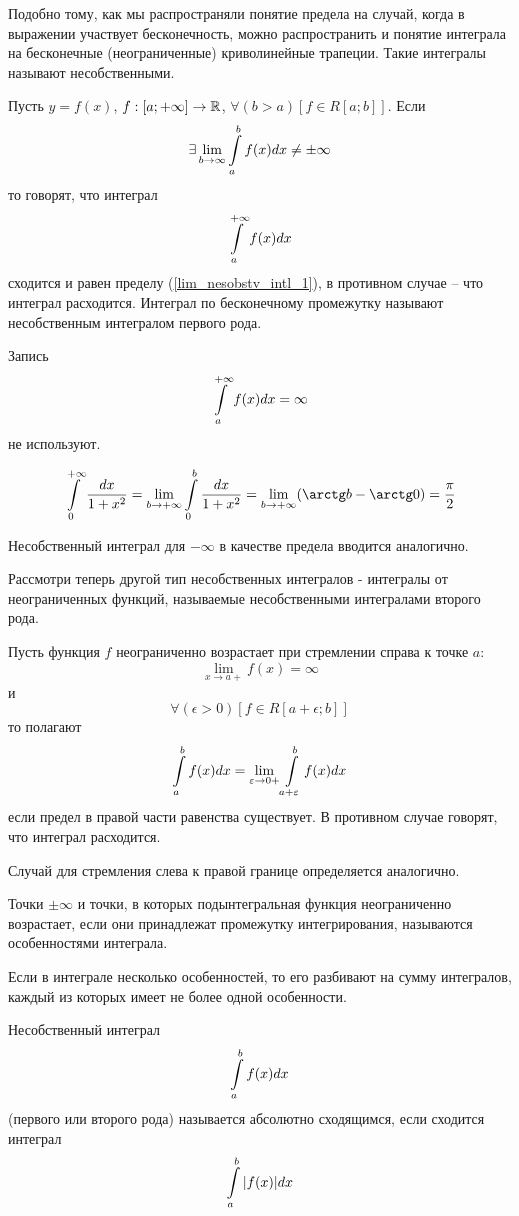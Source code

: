 Подобно тому, как мы распространяли понятие предела на случай, когда в выражении участвует бесконечность, можно распространить и понятие интеграла на бесконечные (неограниченные) криволинейные трапеции.
Такие интегралы называют несобственными.

\begin{opr}\label{opr_nesobstv_intl_1}
Пусть $y=f(x)$, $f:[a;+\infty]\to\mathbb{R}$, $\forall(b>a)[f\in R[a;b]]$.
Если 
\begin{equation}\label{lim_nesobstv_intl_1}
\exists \lim_{b\to\infty}\int\limits_a^b f(x)dx\neq \pm\infty
\end{equation}
то говорят, что интеграл
\begin{equation}\label{nesobstv_intl_1}
\int\limits_a^{+\infty}f(x)dx
\end{equation}
сходится и равен пределу (\ref{lim_nesobstv_intl_1}), в противном случае -- что интеграл расходится.
Интеграл по бесконечному промежутку называют несобственным интегралом первого рода.
\end{opr}

Запись
$$
\int\limits_a^{+\infty}f(x)dx=\infty
$$
не используют.

\begin{primer}
$$
\intl_0^{+\infty}\frac{dx}{1+x^2}=\lim_{b\to+\infty}\intl_0^{b}\frac{dx}{1+x^2}=
\lim_{b\to+\infty}(\arctg b - \arctg 0)=\frac{\pi}{2}
$$
\end{primer}

Несобственный интеграл для $-\infty$ в качестве предела вводится аналогично.

Рассмотри теперь другой тип несобственных интегралов - интегралы от неограниченных функций, называемые несобственными интегралами второго рода.

\begin{opr}
Пусть функция $f$ неограниченно возрастает при стремлении справа к точке $a$:
$$
\lim_{x\to a +}f(x)=\infty
$$
и
$$
\forall(\epsilon>0)[f\in R[a+\epsilon;b]]
$$
то полагают
$$
\int\limits_a^bf(x)dx=\lim_{\varepsilon\to 0+}\int\limits_{a+\varepsilon}^b f(x)dx
$$
если предел в правой части равенства существует.
В противном случае говорят, что интеграл расходится.
\end{opr}
Случай для стремления слева к правой границе определяется аналогично.

\begin{opr}
Точки $\pm\infty$ и точки, в которых подынтегральная функция неограниченно возрастает, если они принадлежат промежутку интегрирования, называются особенностями интеграла.
\end{opr}
Если в интеграле несколько особенностей, то его разбивают на сумму интегралов, каждый из которых имеет не более одной особенности.

\begin{opr}
Несобственный интеграл
$$
\int\limits_a^b f(x) dx
$$
(первого или второго рода) называется абсолютно сходящимся, если сходится интеграл
$$
\int\limits_a^b |f(x)| dx
$$

\end{opr}
